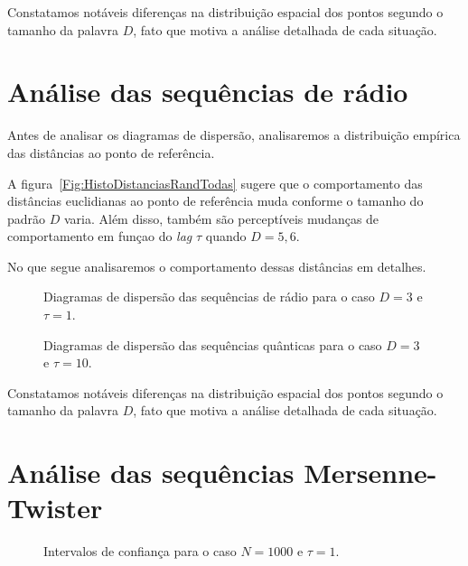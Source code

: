Constatamos notáveis diferenças na distribuição espacial dos pontos segundo o tamanho da palavra $D$, fato que motiva a análise detalhada de cada situação.

\section{Análise das sequências de rádio}


Antes de analisar os diagramas de dispersão, analisaremos a distribuição empírica das distâncias ao ponto de referência.

A figura~\ref{Fig:HistoDistanciasRandTodas} sugere que o comportamento das distâncias euclidianas ao ponto de referência muda conforme o tamanho do padrão $D$ varia.
Além disso, também são perceptíveis mudanças de comportamento em funçao do \textit{lag} $\tau$ quando $D=5,6$.

No que segue analisaremos o comportamento dessas distâncias em detalhes.


\begin{figure}
	\centering
	\caption{Diagramas de dispersão das sequências de rádio para o caso $D=3$ e $\tau=1$.}\label{Fig:QuantD3tau1}
\end{figure}

\begin{figure}
	\centering
	\caption{Diagramas de dispersão das sequências quânticas para o caso $D=3$ e $\tau=10$.}\label{Fig:QuantD3tau10}
\end{figure}


Constatamos notáveis diferenças na distribuição espacial dos pontos segundo o tamanho da palavra $D$, fato que motiva a análise detalhada de cada situação.

\section{Análise das sequências Mersenne-Twister}

\begin{figure}
	\centering
	\caption{Intervalos de confiança para o caso $N=1000$ e $\tau=1$.}\label{Fig:Conf_Int_1k_T1}
\end{figure}


